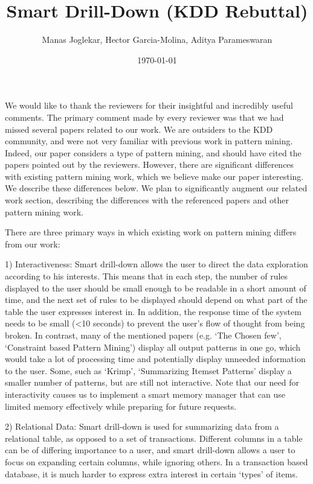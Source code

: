 \documentclass{article}
\date{\today}
\begin{document}
\title{Smart Drill-Down (KDD Rebuttal)}
\author{Manas Joglekar, Hector Garcia-Molina, Aditya Parameswaran}
\maketitle

We would like to thank the reviewers for their insightful and incredibly useful comments. The primary comment made by every reviewer was that we had missed several papers related to our work. We are outsiders to the KDD community, and were not very familiar with previous work in pattern mining. Indeed, our paper considers a type of pattern mining, and should have cited the papers pointed out by the reviewers. However, there are significant differences with existing pattern mining work, which we believe make our paper interesting. We describe these differences below. We plan to significantly augment our related work section, describing the differences with the referenced papers and other pattern mining work.

There are three primary ways in which existing work on pattern mining differs from our work:

1) Interactiveness: Smart drill-down allows the user to direct the data exploration according to his interests. This means that in each step, the number of rules displayed to the user should be small enough to be readable in a short amount of time, and the next set of rules to be displayed should depend on what part of the table the user expresses interest in. In addition, the response time of the system needs to be small (<10 seconds) to prevent the user's flow of thought from being broken. In contrast, many of the mentioned papers (e.g. `The Chosen few', `Constraint based Pattern Mining') display all output patterns in one go, which would take a lot of processing time and potentially display unneeded information to the user. Some, such as `Krimp', `Summarizing Itemset Patterns' display a smaller number of patterns, but are still not interactive. Note that our need for interactivity causes us to implement a smart memory manager that can use limited memory effectively while preparing for future requests.

2) Relational Data: Smart drill-down is used for summarizing data from a relational table, as opposed to a set of transactions. Different columns in a table can be of differing importance to a user, and smart drill-down allows a user to focus on expanding certain columns, while ignoring others. In a transaction based database, it is much harder to express extra interest in certain `types' of items.
\end{document}
